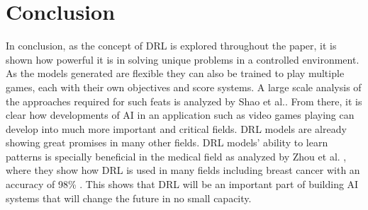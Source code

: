 \documentclass[conference]{IEEEtran}
\begin{document}
\section{Conclusion}
In conclusion, as the concept of DRL is explored throughout the paper, it is shown how powerful it is in solving unique problems in a controlled environment. As the models generated are flexible they can also be trained to play multiple games, each with their own objectives and score systems. A large scale analysis of the approaches required for such feats is analyzed by Shao et al.\cite{shao2019survey}. From there, it is clear how developments of AI in an application such as video games playing can develop into much more important and critical fields. DRL models are already showing great promises in many other fields. DRL models' ability to learn patterns is specially beneficial in the medical field as analyzed by Zhou et al. \cite{drl_med}, where they show how DRL is used in many fields including breast cancer with an accuracy of 98\% \cite{xu2019attention}. This shows that DRL will be an important part of building AI systems that will change the future in no small capacity.
 

\end{document}
